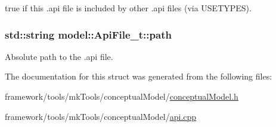 true if this .api file is included by other .api files (via U\+S\+E\+T\+Y\+P\+ES). 

\subsubsection[{\texorpdfstring{path}{path}}]{\setlength{\rightskip}{0pt plus 5cm}std\+::string model\+::\+Api\+File\+\_\+t\+::path}\hypertarget{structmodel_1_1_api_file__t_a98cdd189e475f550e6ca72a2295a29a7}{}\label{structmodel_1_1_api_file__t_a98cdd189e475f550e6ca72a2295a29a7}


Absolute path to the .api file. 



The documentation for this struct was generated from the following files\+:\begin{DoxyCompactItemize}
\item 
framework/tools/mk\+Tools/conceptual\+Model/\hyperlink{conceptual_model_8h}{conceptual\+Model.\+h}\item 
framework/tools/mk\+Tools/conceptual\+Model/\hyperlink{api_8cpp}{api.\+cpp}\end{DoxyCompactItemize}
